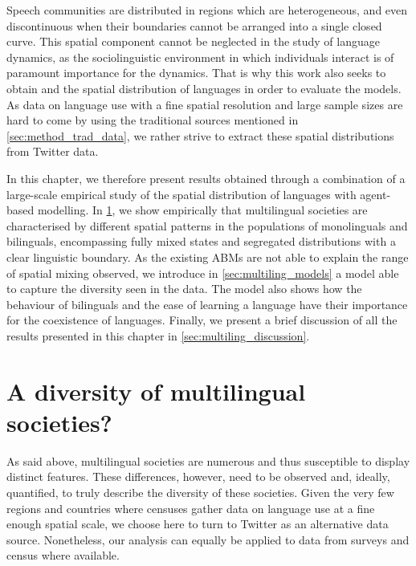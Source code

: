 \documentclass[../thesis.tex]{subfiles}
\begin{document}
Speech communities are distributed in regions which are heterogeneous, and even
discontinuous when their boundaries cannot be arranged into a single closed curve. This
spatial component cannot be neglected in the study of language dynamics, as the
sociolinguistic environment in which individuals interact is of paramount importance for
the dynamics. That is why this work also seeks to obtain and the spatial distribution of
languages in order to evaluate the models. As data on language use with a fine spatial
resolution and large sample sizes are hard to come by using the traditional sources
mentioned in \cref{sec:method_trad_data}, we rather strive to extract these spatial
distributions from Twitter data.

In this chapter, we therefore present results obtained through a combination of a
large-scale empirical study of the spatial distribution of languages with agent-based
modelling. In \cref{sec:multiling_data}, we show empirically that multilingual societies
are characterised by different spatial patterns in the populations of monolinguals and
bilinguals, encompassing fully mixed states and segregated distributions with a clear
linguistic boundary. As the existing \acp{ABM} are not able to explain the range of
spatial mixing observed, we introduce in \cref{sec:multiling_models} a model able to
capture the diversity seen in the data. The model also shows how the behaviour of
bilinguals and the ease of learning a language have their importance for the coexistence
of languages. Finally, we present a brief discussion of all the results presented in
this chapter in \cref{sec:multiling_discussion}.



\section{A diversity of multilingual societies?}
\label{sec:multiling_data}
As said above, multilingual societies are numerous and thus susceptible to display
distinct features. These differences, however, need to be observed and, ideally,
quantified, to truly describe the diversity of these societies. Given the very few
regions and countries where censuses gather data on language use at a fine enough
spatial scale, we choose here to turn to Twitter as an alternative data source.
Nonetheless, our analysis can equally be applied to data from surveys and census where
available.
\end{document}

